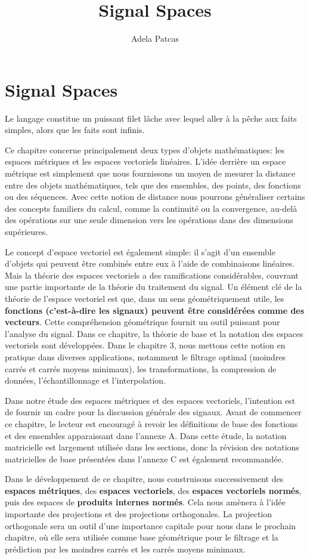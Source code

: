 \documentclass[11pt,twoside,a4paper]{article}
\author{Adela Patcas}
\title{Signal Spaces}
\begin{document}
\section*{Signal Spaces}
Le langage constitue un puissant filet lâche avec lequel aller à la pêche aux faits simples, alors que les faits sont infinis.

Ce chapitre concerne principalement deux types d'objets mathématiques: les espaces métriques et les espaces vectoriels linéaires. L'idée derrière un espace métrique est 
simplement que nous fournissons un moyen de mesurer la distance entre des objets mathématiques, tels que des ensembles, des points, des fonctions ou des séquences. 
Avec cette notion de distance nous pourrons généraliser certains des concepts familiers du calcul, comme la continuité ou la convergence, au-delà des opérations sur une 
seule dimension vers les opérations dans des dimensions supérieures.

Le concept d'espace vectoriel est également simple: il s'agit d'un ensemble d'objets qui peuvent être combinés entre eux à l'aide de combinaisons linéaires. 
Mais la théorie des espaces vectoriels a des ramifications considérables, couvrant une partie importante de la théorie du traitement du signal. Un élément clé de la 
théorie de l'espace vectoriel est que, dans un sens géométriquement utile, les \textbf{fonctions (c'est-à-dire les signaux) peuvent être considérées comme des vecteurs}. 
Cette compréhension géométrique fournit un outil puissant pour l'analyse du signal. Dans ce chapitre, la théorie de base et la notation des espaces vectoriels sont développées. 
Dans le chapitre 3, nous mettons cette notion en pratique dans diverses applications, notamment le filtrage optimal (moindres carrés et carrés moyens minimaux), les transformations, 
la compression de données, l'échantillonnage et l'interpolation.

Dans notre étude des espaces métriques et des espaces vectoriels, l'intention est de fournir un cadre pour la discussion générale des signaux. Avant de commencer ce chapitre, 
le lecteur est encouragé à revoir les définitions de base des fonctions et des ensembles apparaissant dans l'annexe A. Dans cette étude, la notation matricielle est largement 
utilisée dans les sections, donc la révision des notations matricielles de base présentées dans l'annexe C est également recommandée.

Dans le développement de ce chapitre, nous construisons successivement des \textbf{espaces métriques}, des \textbf{espaces vectoriels}, des \textbf{espaces vectoriels normés}, puis des espaces de \textbf{produits internes normés}. 
Cela nous amènera à l'idée importante des projections et des projections orthogonales. La projection orthogonale sera un outil d'une importance capitale pour nous dans le prochain chapitre, 
où elle sera utilisée comme base géométrique pour le filtrage et la prédiction par les moindres carrés et les carrés moyens minimaux.
\end{document}
